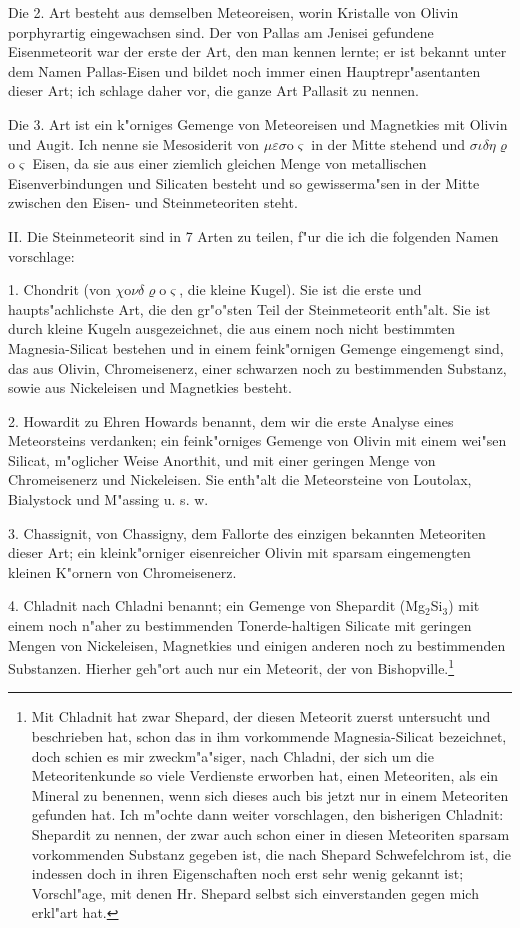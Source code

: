 \documentclass[a4paper, 11pt, oneside]{article}
\begin{document}
Die 2. Art besteht aus demselben Meteoreisen, worin Kristalle von Olivin porphyrartig eingewachsen sind. Der von Pallas am Jenisei gefundene Eisenmeteorit war der erste der Art, den man kennen lernte; er ist bekannt unter dem Namen Pallas-Eisen und bildet noch immer einen Hauptrepr"asentanten dieser Art; ich schlage daher vor, die ganze Art Pallasit zu nennen.

Die 3. Art ist ein k"orniges Gemenge von Meteoreisen und Magnetkies mit Olivin und Augit. Ich nenne sie Mesosiderit von $\mu\varepsilon\sigma$o$\varsigma$ in der Mitte stehend und $\sigma\iota\delta\eta\varrho$o$\varsigma$ Eisen, da sie aus einer ziemlich gleichen Menge von metallischen Eisenverbindungen und Silicaten besteht und so gewisserma"sen in der Mitte zwischen den Eisen- und Steinmeteoriten steht.

II. Die Steinmeteorit sind in 7 Arten zu teilen, f"ur die ich die folgenden Namen vorschlage:

1. Chondrit (von $\chi$o$\nu\delta\varrho$o$\varsigma$, die kleine Kugel). Sie ist die erste und haupts"achlichste Art, die den gr"o"sten Teil der Steinmeteorit enth"alt. Sie ist durch kleine Kugeln ausgezeichnet, die aus einem noch nicht bestimmten Magnesia-Silicat bestehen und in einem feink"ornigen Gemenge eingemengt sind, das aus Olivin, Chromeisenerz, einer schwarzen noch zu bestimmenden Substanz, sowie aus Nickeleisen und Magnetkies besteht.

2. Howardit zu Ehren Howards benannt, dem wir die erste Analyse eines Meteorsteins verdanken; ein feink"orniges Gemenge von Olivin mit einem wei"sen Silicat, m"oglicher Weise Anorthit, und mit einer geringen Menge von Chromeisenerz und Nickeleisen. Sie enth"alt die Meteorsteine von Loutolax, Bialystock und M"assing u. s. w.

3. Chassignit, von Chassigny, dem Fallorte des einzigen bekannten Meteoriten dieser Art; ein kleink"orniger eisenreicher Olivin mit sparsam eingemengten kleinen K"ornern von Chromeisenerz.

4. Chladnit nach Chladni benannt; ein Gemenge von Shepardit (Mg$_{2}$Si$_{3}$) mit einem noch n"aher zu bestimmenden Tonerde-haltigen Silicate mit geringen Mengen von Nickeleisen, Magnetkies und einigen anderen noch zu bestimmenden Substanzen. Hierher geh"ort auch nur ein Meteorit, der von Bishopville.\footnote{Mit Chladnit hat zwar Shepard, der diesen Meteorit zuerst untersucht und beschrieben hat, schon das in ihm vorkommende Magnesia-Silicat bezeichnet, doch schien es mir zweckm"a"siger, nach Chladni, der sich um die Meteoritenkunde so viele Verdienste erworben hat, einen Meteoriten, als ein Mineral zu benennen, wenn sich dieses auch bis jetzt nur in einem Meteoriten gefunden hat. Ich m"ochte dann weiter vorschlagen, den bisherigen Chladnit: Shepardit zu nennen, der zwar auch schon einer in diesen Meteoriten sparsam vorkommenden Substanz gegeben ist, die nach Shepard Schwefelchrom ist, die indessen doch in ihren Eigenschaften noch erst sehr wenig gekannt ist; Vorschl"age, mit denen Hr. Shepard selbst sich einverstanden gegen mich erkl"art hat.}
\end{document}
